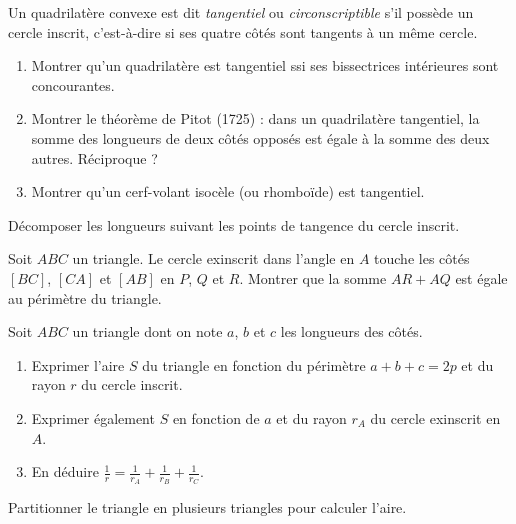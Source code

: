 \begin{exo}%
Un quadrilatère convexe est dit \emph{tangentiel} ou \emph{circonscriptible} s'il possède un cercle inscrit, c'est-à-dire si ses quatre côtés sont tangents à un même cercle.

\begin{enumerate}
\item Montrer qu'un quadrilatère est tangentiel ssi ses bissectrices intérieures sont concourantes.
\item Montrer le théorème de Pitot (1725) : dans un quadrilatère tangentiel, la somme des longueurs de deux côtés opposés est égale à la somme des deux autres. Réciproque ?
\item Montrer qu'un cerf-volant isocèle (ou rhomboïde) est tangentiel.
\end{enumerate}

\begin{hint}   
Décomposer les longueurs suivant les points de tangence du cercle inscrit.
\end{hint}
     
      
\end{exo}  





\begin{exo}%
Soit $ABC$ un triangle. Le cercle exinscrit dans l'angle en $A$ touche les côtés $[BC]$, $[CA]$ et $[AB]$ en $P$, $Q$ et $R$. Montrer que la somme $AR+AQ$ est égale au périmètre du triangle.
\end{exo} 


\begin{exo}%
Soit $ABC$ un triangle dont on note $a$, $b$ et $c$ les longueurs des côtés.
\begin{enumerate}
\item Exprimer l'aire $S$ du triangle en fonction du périmètre $a+b+c=2p$ et du rayon $r$ du cercle inscrit.
\item Exprimer également $S$ en fonction de $a$ et du rayon $r_A$ du cercle exinscrit en $A$.
\item En déduire $\frac{1}{r} = \frac{1}{r_A}+\frac{1}{r_B}+\frac{1}{r_C}$.
\end{enumerate}

\begin{hint}   
Partitionner le triangle en plusieurs triangles pour calculer l'aire.
\end{hint}   
\end{exo}  



